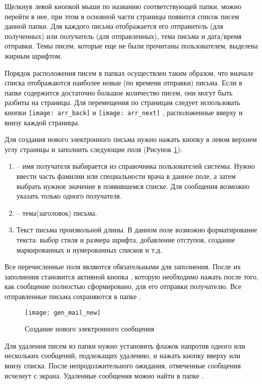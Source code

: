 Щелкнув левой кнопкой мыши по названию соответствующей папки, можно перейти в нее, при этом в основной части страницы появится список писем данной папки. Для каждого письма отображается его отправитель (для полученных) или получатель (для отправленных), тема письма и дата/время отправки. Темы писем, которые еще не были прочитаны пользователем, выделена жирным шрифтом.

Порядок расположения писем в папках осуществлен таким образом, что вначале списка отображаются наиболее новые (по времени отправки) письма. Если в папке содержится достаточно большое количество писем, они могут быть разбиты на страницы. Для перемещения по страницам следует использовать кнопки \texttt{[image: arr\_back]} и \texttt{[image: arr\_next]} , расположенные вверху и внизу каждой страницы.

Для создания нового электронного письма нужно нажать кнопку  в левом верхнем углу страницы и заполнить следующие поля (Рисунок \ref{img_gen_mail_new}):
\begin{enumerate}
 \item {} -- имя получателя выбирается из справочника пользователей системы. Нужно ввести часть фамилии или специальности врача в данное поле, а затем выбрать нужное значение в появившемся списке. Для сообщения возможно указать только одного получателя. 
 \item {} -- тема(заголовок) письма.
 \item Текст письма произвольной длины. В данном поле возможно форматирование текста: выбор стиля и размера шрифта, добавление отступов, создание маркированных и нумерованных списков и т.д.
\end{enumerate}

Все перечисленные поля являются обязательными для заполнения. После их заполнения становится активной кнопка , которую необходимо нажать после того, как сообщение полностью сформировано, для его отправки получателю. Все отправленные письма сохраняются в папке .
  
 \begin{figure}[!ht]\centering
 	\texttt{[image: gen\_mail\_new]}
 	\caption{Создание нового электронного сообщения}
 	\label{img_gen_mail_new}
 \end{figure}

Для удаления писем из папки нужно установить флажок напротив одного или нескольких сообщений, подлежащих удалению, и нажать кнопку  вверху или внизу списка. После непродолжительного ожидания, отмеченные сообщения исчезнут с экрана. Удаленные сообщения можно найти в папке .

